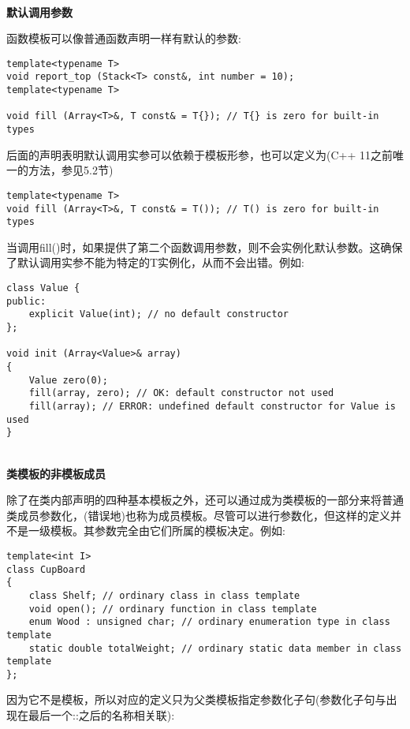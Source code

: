 \hspace*{\fill} \\ %
\noindent
\textbf{默认调用参数}

函数模板可以像普通函数声明一样有默认的参数:

\begin{lstlisting}[style=styleCXX]
template<typename T>
void report_top (Stack<T> const&, int number = 10);
template<typename T>

void fill (Array<T>&, T const& = T{}); // T{} is zero for built-in types
\end{lstlisting}

后面的声明表明默认调用实参可以依赖于模板形参，也可以定义为(C++ 11之前唯一的方法，参见5.2节)

\begin{lstlisting}[style=styleCXX]
template<typename T>
void fill (Array<T>&, T const& = T()); // T() is zero for built-in types
\end{lstlisting}

当调用fill()时，如果提供了第二个函数调用参数，则不会实例化默认参数。这确保了默认调用实参不能为特定的T实例化，从而不会出错。例如:

\begin{lstlisting}[style=styleCXX]
class Value {
public:
	explicit Value(int); // no default constructor
};

void init (Array<Value>& array)
{
	Value zero(0);
	fill(array, zero); // OK: default constructor not used
	fill(array); // ERROR: undefined default constructor for Value is used
}
\end{lstlisting}

\hspace*{\fill} \\ %
\noindent
\textbf{类模板的非模板成员}

除了在类内部声明的四种基本模板之外，还可以通过成为类模板的一部分来将普通类成员参数化，(错误地)也称为成员模板。尽管可以进行参数化，但这样的定义并不是一级模板。其参数完全由它们所属的模板决定。例如:

\begin{lstlisting}[style=styleCXX]
template<int I>
class CupBoard
{
	class Shelf; // ordinary class in class template
	void open(); // ordinary function in class template
	enum Wood : unsigned char; // ordinary enumeration type in class template
	static double totalWeight; // ordinary static data member in class template
};
\end{lstlisting}

因为它不是模板，所以对应的定义只为父类模板指定参数化子句(参数化子句与出现在最后一个::之后的名称相关联):

